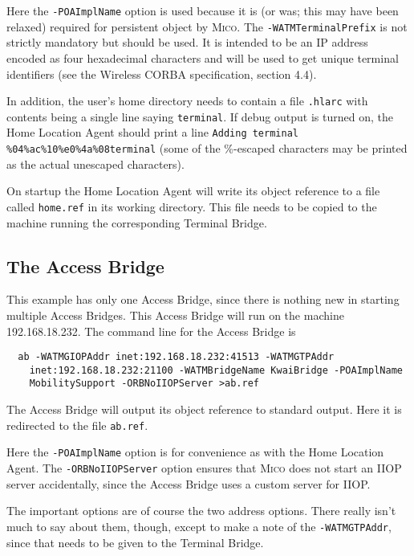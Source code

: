 \documentclass[12pt,a4paper,draft]{article}
\newcommand{\MICO}{\textsc{Mico}}
\begin{document}
Here the \texttt{-POAImplName} option is used because it is (or was;
this may have been relaxed) required for persistent object by \MICO{}.
The \texttt{-WATMTerminalPrefix} is not strictly mandatory but should
be used.  It is intended to be an IP address encoded as four
hexadecimal characters and will be used to get unique terminal
identifiers (see the Wireless CORBA specification, section 4.4).

In addition, the user's home directory needs to contain a file
\texttt{.hlarc} with contents being a single line saying
\texttt{terminal}.  If debug output is turned on, the Home Location
Agent should print a line \texttt{Adding terminal
  \%04\%ac\%10\%e0\%4a\%08terminal} (some of the \%-escaped characters
may be printed as the actual unescaped characters).

On startup the Home Location Agent will write its object reference to
a file called \texttt{home.ref} in its working directory.  This file
needs to be copied to the machine running the corresponding Terminal
Bridge.

\subsection{The Access Bridge}

This example has only one Access Bridge, since there is nothing new in
starting multiple Access Bridges.  This Access Bridge will run on the
machine 192.168.18.232.  The command line for the Access Bridge is

\small
\begin{verbatim}
  ab -WATMGIOPAddr inet:192.168.18.232:41513 -WATMGTPAddr
    inet:192.168.18.232:21100 -WATMBridgeName KwaiBridge -POAImplName
    MobilitySupport -ORBNoIIOPServer >ab.ref
\end{verbatim}
\normalsize

The Access Bridge will output its object reference to standard
output.  Here it is redirected to the file \texttt{ab.ref}.

Here the \texttt{-POAImplName} option is for convenience as with the
Home Location Agent.  The \texttt{-ORBNoIIOPServer} option ensures
that \MICO{} does not start an IIOP server accidentally, since the
Access Bridge uses a custom server for IIOP.

The important options are of course the two address options.  There
really isn't much to say about them, though, except to make a note of
the \texttt{-WATMGTPAddr}, since that needs to be given to the
Terminal Bridge.
\end{document}
